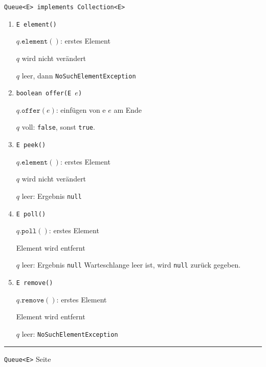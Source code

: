 \documentclass{slides}
\newcounter{mypage}
\begin{document}
\begin{slide}{}
\normalsize

\begin{center}
\texttt{Queue<E> implements Collection<E>}
\end{center}
\vspace*{0.5cm}

\footnotesize
\begin{enumerate}
\item \texttt{E element()}
  
      $q.\mathtt{element}()$: erstes Element 

      $q$ wird nicht ver\"andert

      $q$ leer, dann \texttt{NoSuchElementException} 
\item \texttt{boolean offer(E $e$)}

      $q.\mathtt{offer}(e)$: \quad einf\"ugen von e $e$ am Ende

      $q$ voll:  \texttt{false}, sonst \texttt{true}.
\item \texttt{E peek()}

      $q.\mathtt{element}()$: erstes Element 

      $q$ wird nicht ver\"andert

      $q$ leer: Ergebnis \texttt{null} 
\item \texttt{E poll()}

      $q.\mathtt{poll}()$:  erstes Element 

      Element wird entfernt

      $q$ leer: Ergebnis \texttt{null} 
      Warteschlange leer ist, wird \texttt{null} zur\"uck gegeben.
\item \texttt{E remove()}

      $q.\mathtt{remove}()$: erstes Element 

      Element wird entfernt

      $q$ leer: \texttt{NoSuchElementException}
\end{enumerate}


\vspace*{\fill}
\tiny \addtocounter{mypage}{1}
\rule{17cm}{1mm}
\texttt{Queue<E>} \hspace*{\fill} Seite 
\end{slide}


\end{document}
